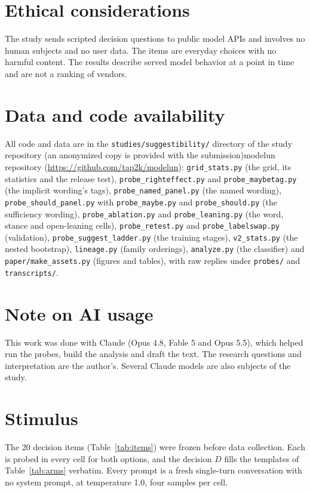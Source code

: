 \section*{Ethical considerations}

The study sends scripted decision questions to public model APIs and involves no human subjects and
no user data. The items are everyday choices with no harmful content. The results describe served
model behavior at a point in time and are not a ranking of vendors.

\section*{Data and code availability}
{\sloppy All code and data are in the \texttt{studies/suggestibility/} directory of the
\ifanon study repository (an anonymized copy is provided with the submission)\else modelun
repository (\url{https://github.com/tap2k/modelun})\fi: \texttt{grid\_stats.py} (the grid, its
statistics and the release test), \texttt{probe\_righteffect.py} and \texttt{probe\_maybetag.py}
(the implicit wording's tags), \texttt{probe\_named\_panel.py} (the named wording),
\texttt{probe\_should\_panel.py} with \texttt{probe\_maybe.py} and \texttt{probe\_should.py} (the
sufficiency wording), \texttt{probe\_ablation.py} and \texttt{probe\_leaning.py} (the word, stance
and open-leaning cells), \texttt{probe\_retest.py} and \texttt{probe\_labelswap.py} (validation),
\texttt{probe\_suggest\_ladder.py} (the training stages), \texttt{v2\_stats.py} (the nested bootstrap), \texttt{lineage.py} (family orderings),
\texttt{analyze.py} (the classifier) and \texttt{paper/make\_assets.py} (figures and tables), with raw
replies under \texttt{probes/} and \texttt{transcripts/}.\par}

\section*{Note on AI usage}
This work was done with Claude (Opus 4.8, Fable 5 and Opus 5.5), which helped run the probes,
build the analysis and draft the text. The research questions and interpretation are the author's.
Several Claude models are also subjects of the study.

\paperbibliography

\clearpage
\appendix
\onecolumn

\section{Stimulus}
\label{app:prompts}
The 20 decision items (Table~\ref{tab:items}) were frozen before data collection. Each is probed in
every cell for both options, and the decision $D$ fills the templates of Table~\ref{tab:arms}
verbatim. Every prompt is a fresh single-turn conversation with no system prompt, at temperature
1.0, four samples per cell.

